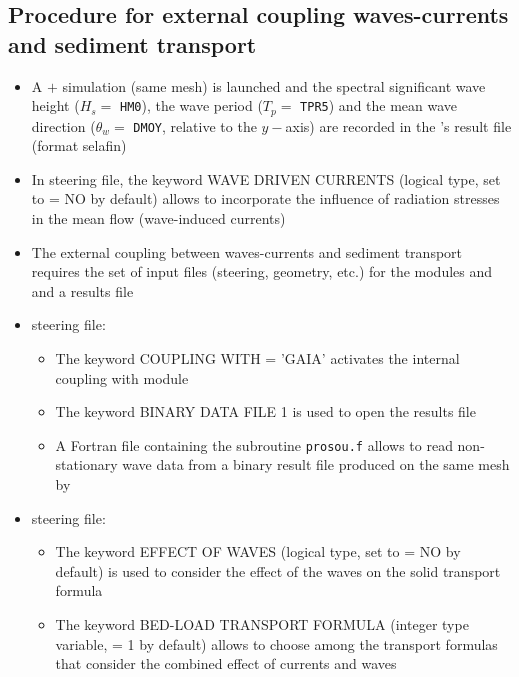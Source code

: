 \subsection{Procedure for external coupling waves-currents and sediment transport}
\begin{itemize}
\item A  $+$ \tomawac{} simulation (same mesh) is launched and the spectral significant wave height ($H_s =$ \texttt{HM0}), the wave period ($T_p =$ \texttt{TPR5}) and the mean wave direction ($\theta_w =$ \texttt{DMOY}, relative to the $y-$axis) are recorded in the \tomawac{}'s result file (format selafin)

\item In  steering file, the keyword {\ttfamily WAVE DRIVEN CURRENTS} (logical type, set to {\ttfamily = NO} by default) allows to incorporate the influence of radiation stresses in the mean flow (wave-induced currents)

\item The external coupling between waves-currents and sediment transport requires the set of input files (steering, geometry, etc.) for the modules  and \gaia{} and a results file \tomawac{}



\end{itemize}

\begin{itemize}
\item {} steering file:
\begin{itemize}
\item The keyword {\ttfamily COUPLING WITH = 'GAIA'} activates the internal coupling with module \gaia{}
\item The keyword {\ttfamily BINARY DATA FILE 1} is used to open the \tomawac{} results file
\item A Fortran file containing the subroutine \texttt{prosou.f} allows to read non-stationary wave data from a binary result file produced on the same mesh by \tomawac{}
\end{itemize}
\item \gaia{} steering file:
\begin{itemize}
\item The keyword {\ttfamily EFFECT OF WAVES} (logical type, set to {\ttfamily = NO} by default) is used to consider the effect of the waves on the solid transport formula
\item The keyword {\ttfamily BED-LOAD TRANSPORT FORMULA} (integer type variable, {\ttfamily = 1} by default) allows to choose among the transport formulas that consider the combined effect of currents and waves
\end{itemize}
\end{itemize}

